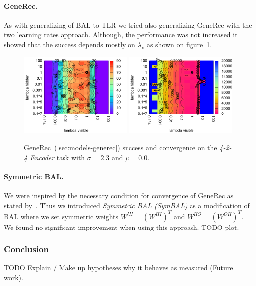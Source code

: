 \paragraph{GeneRec.} 
As with generalizing of BAL to TLR we tried also generalizing GeneRec with the two learning rates approach. Although, the performance was not increased it showed that the success depends mostly on $\lambda_v$ as shown on figure~\ref{fig:results-generec-auto4-performance}. 
\begin{figure}[H]
  \centering
  \includegraphics[width=0.49\textwidth]{img/generec-auto4-success.pdf}   
  \includegraphics[width=0.49\textwidth]{img/generec-auto4-epoch.pdf}     
  \caption{GeneRec~(\ref{sec:models-generec}) success and convergence on the \emph{4-2-4 Encoder} task with $\sigma = 2.3$ and $\mu = 0.0$.}
  \label{fig:results-generec-auto4-performance}
\end{figure}

\paragraph{Symmetric BAL.} 
\label{sec:our-bal-sym} 
We were inspired by the necessary condition for convergence of GeneRec as stated by~\citet{o1996bio}. Thus we introduced \emph{Symmetric BAL (SymBAL)} as a modification of BAL where we set symmetric weights $W^{IH} = (W^{HI})^T$ and $W^{HO} = (W^{OH})^T$. We found no significant improvement when using this approach. TODO plot. 

\subsubsection{Conclusion} 
\label{sec:tlr-auto4-conclusion} 

TODO Explain / Make up hypotheses why it behaves as measured (Future work). \\
